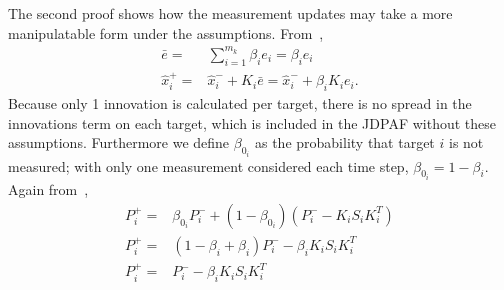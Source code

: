 \documentclass[letterpaper, 10pt, conference]{ieeeconf}
\begin{document}
\begin{appendix}
The second proof shows how the measurement updates may take a more manipulatable form under the assumptions. From~\cite{TrackDataAssoc},
\begin{align}
\bar e=&\displaystyle\sum\limits_{i=1}^{m_k}\beta_ie_i=\beta_ie_i\\
\hat x^+_i=&\hat x^-_i+K_i\bar e=\hat x^-_i+\beta_iK_ie_i.
\end{align}
Because only 1 innovation is calculated per target, there is no spread in the innovations term on each target, which is included in the JDPAF without these assumptions. Furthermore we define $\beta_{0_i}$ as the probability that target $i$ is not measured; with only one measurement considered each time step, $\beta_{0_i}=1-\beta_i$. Again from~\cite{TrackDataAssoc},
\begin{align}
P^+_i=&\beta_{0_i}P^-_i+(1-\beta_{0_i})(P^-_i-K_iS_iK_i^T)\\
P^+_i=&(1-\beta_i+\beta_i)P^-_i-\beta_iK_iS_iK_i^T\\
P^+_i=&P^-_i-\beta_iK_iS_iK_i^T
\end{align}



\end{appendix}



\end{document}
